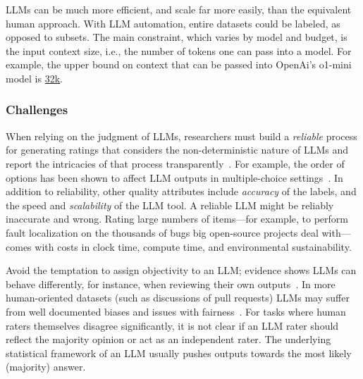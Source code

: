 LLMs can be much more efficient, and scale far more easily, than the equivalent human approach. With LLM automation, entire datasets could be labeled, as opposed to subsets. The main constraint, which varies by model and budget, is the input context size, i.e., the number of tokens one can pass into a model. For example, the upper bound on context that can be passed into OpenAi's \textsf{o1-mini} model is \href{https://help.openai.com/en/articles/9855712-openai-o1-models-faq-chatgpt-enterprise-and-edu}{32k}. 

\subsubsection{Challenges}

When relying on the judgment of LLMs, researchers must build a \textit{reliable} process for generating ratings that considers the non-deterministic nature of LLMs and report the intricacies of that process transparently~\cite{DBLP:journals/corr/abs-2412-12509}. For example, the order of options has been shown to affect LLM outputs in multiple-choice settings~\cite{DBLP:conf/naacl/PezeshkpourH24}. 
In addition to reliability, other quality attributes include \textit{accuracy} of the labels, and the speed and \textit{scalability} of the LLM tool. 
A reliable LLM might be reliably inaccurate and wrong. 
Rating large numbers of items---for example, to perform fault localization on the thousands of bugs big open-source projects deal with---comes with costs in clock time, compute time, and environmental sustainability.

Avoid the temptation to assign objectivity to an LLM; evidence shows LLMs can behave differently, for instance, when reviewing their own outputs~\cite{NEURIPS2024_7f1f0218}. In more human-oriented datasets (such as discussions of pull requests) LLMs may suffer from well documented biases and issues with fairness~\cite{Gallegos2024BiasAF}. 
For tasks where human raters themselves disagree significantly, it is not clear if an LLM rater should reflect the majority opinion or act as an independent rater. The underlying statistical framework of an LLM usually pushes outputs towards the most likely (majority) answer. 

